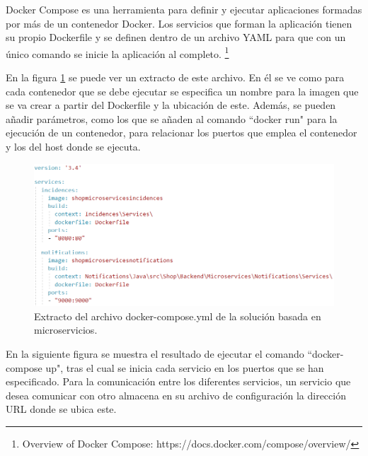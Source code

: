 \documentclass[11pt,spanish,listoffigures]{tfgetsinf}
\begin{document}
Docker Compose es una herramienta para definir y ejecutar aplicaciones formadas por más de un contenedor Docker. Los servicios que forman la aplicación tienen su propio Dockerfile y se definen dentro de un archivo YAML para que con un único comando se inicie la aplicación al completo. \footnote{ Overview of Docker Compose: https://docs.docker.com/compose/overview/} 

En la figura \ref{fig:Compose} se puede ver un extracto de este archivo. En él se ve como para cada contenedor que se debe ejecutar se especifica un nombre para la imagen que se va crear a partir del Dockerfile y la ubicación de este. Además, se pueden añadir parámetros, como los que se añaden al comando ``docker run" para la ejecución de un contenedor, para relacionar los puertos que emplea el contenedor y los del host donde se ejecuta.

\begin{figure}[h]
\centering
\includegraphics[scale=0.6]{Compose}
\caption{Extracto del archivo docker-compose.yml de la solución basada en microservicios.}
\label{fig:Compose}
\end{figure}

\newpage


En la siguiente figura se muestra el resultado de ejecutar el comando ``docker-compose up", tras el cual se inicia cada servicio en los puertos que se han especificado. Para la comunicación entre los diferentes servicios, un servicio que desea comunicar con otro almacena en su archivo de configuración la dirección URL donde se ubica este.
\end{document}
